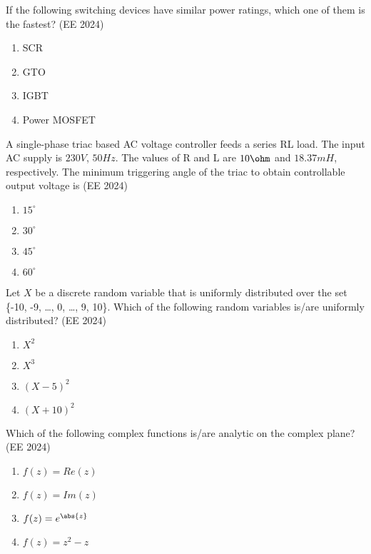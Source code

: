 \iffalse
\title{EE-2024-27-39}
\author{EE24BTECH11041-Mohit}
\section{ee}
\chapter{2024}
\fi

\item If the following switching devices have similar power ratings, which one of them is the fastest?
\hfill{(EE 2024)}
\begin{enumerate}
\item SCR
\item GTO
\item IGBT
\item Power MOSFET
\end{enumerate}
\item  A single-phase triac based AC voltage controller feeds a series RL load. The input AC supply is $230 V$, $50 Hz$. The values of R and L are $10 \ohm$ and $18.37 mH$, respectively. The minimum triggering angle of the triac to obtain controllable output voltage is
\hfill{(EE 2024)}
\begin{enumerate}
\item $15^{\circ}$
\item $30^{\circ}$
\item $45^{\circ}$
\item $60^{\circ}$
\end{enumerate}
\item Let $X$ be a discrete random variable that is uniformly distributed over the set
\{-10, -9, \dots , 0, \dots , 9, 10\}. Which of the following random variables is/are
uniformly distributed?
\hfill{(EE 2024)}
\begin{enumerate}
\item $X^2$
\item $X^3$
\item $(X-5)^2$
\item $(X+10)^2$
\end{enumerate}
\item Which of the following complex functions is/are analytic on the complex plane?
\hfill{(EE 2024)}
\begin{enumerate}
\item $f(z)=Re(z)$
\item $f(z)=Im(z)$
\item $f(z)=e^{\abs{z}}$
\item $f(z)=z^2-z$
\end{enumerate}

